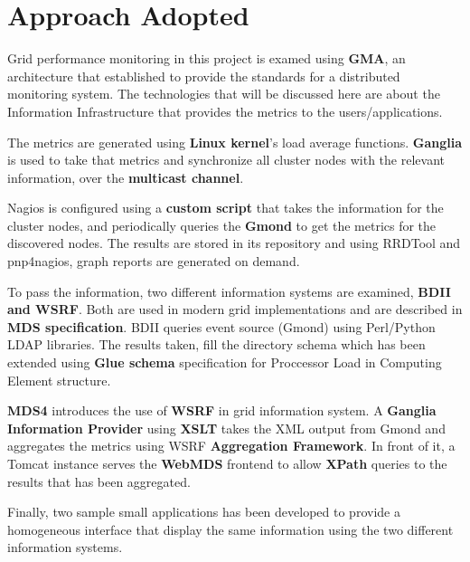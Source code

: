 \section{Approach Adopted}

Grid performance monitoring in this project is examed using {\bf GMA}, an architecture that established to provide the standards for a distributed monitoring system. The technologies that will be discussed here are about the Information Infrastructure that provides the metrics to the users/applications.

The metrics are generated using {\bf Linux kernel}'s load average functions. {\bf Ganglia} is used to take that metrics and synchronize all cluster nodes with the relevant information, over the {\bf multicast channel}.

Nagios is configured using a {\bf custom script} that takes the information for the cluster nodes, and periodically queries the {\bf Gmond} to get the metrics for the discovered nodes. The results are stored in its repository and using RRDTool and pnp4nagios, graph reports are generated on demand.

To pass the information, two different information systems are examined, {\bf BDII and WSRF}. Both are used in modern grid implementations and are described in {\bf MDS specification}. BDII queries event source (Gmond) using Perl/Python LDAP libraries. The results taken, fill the directory schema which has been extended using {\bf Glue schema} specification for Proccessor Load in Computing Element structure.

{\bf MDS4} introduces the use of {\bf WSRF} in grid information system. A {\bf Ganglia Information Provider} using {\bf XSLT} takes the XML output from Gmond and aggregates the metrics using WSRF {\bf Aggregation Framework}. In front of it, a Tomcat instance serves the {\bf WebMDS} frontend to allow {\bf XPath} queries to the results that has been aggregated.

Finally, two sample small applications has been developed to provide a homogeneous interface that display the same information using the two different information systems.

